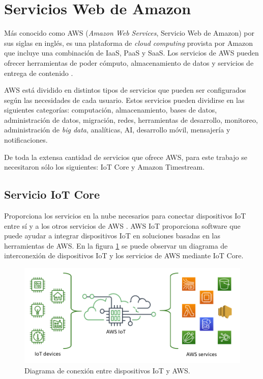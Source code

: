 \section{Servicios Web de Amazon}
Más conocido como AWS (\textit{Amazon Web Services}, Servicio Web de Amazon) por sus siglas en inglés, es una plataforma de \textit{cloud computing} provista por Amazon que incluye una combinación de IaaS, PaaS y SaaS. Los servicios de AWS pueden ofrecer herramientas de poder cómputo, almacenamiento de datos y servicios de entrega de contenido \cite{aws_info}.

AWS está dividido en distintos tipos de servicios que pueden ser configurados según las necesidades de cada usuario. Estos servicios pueden dividirse en las siguientes categorías: computación, almacenamiento, bases de datos, administración de datos, migración, redes, herramientas de desarrollo, monitoreo, administración de \textit{big data}, analíticas, AI, desarrollo móvil, mensajería y notificaciones.

De toda la extensa cantidad de servicios que ofrece AWS, para este trabajo se necesitaron sólo los siguientes: IoT Core y Amazon Timestream.

\subsection{Servicio IoT Core}
Proporciona los servicios en la nube necesarios para conectar dispositivos IoT entre sí y a los otros servicios de AWS \cite{iot_info}. AWS IoT proporciona software que puede ayudar a integrar dispositivos IoT en soluciones basadas en las herramientas de AWS. En la figura \ref{fig:aws_iot} se puede observar un diagrama de interconexión de dispositivos IoT y los servicios de AWS mediante IoT Core.


\begin{figure}[h]
	\centering
	\includegraphics[scale=0.5]{./Figures/aws_iot.png}
	\caption{Diagrama de conexión entre dispositivos IoT y AWS\protect\footnotemark.}
	\label{fig:aws_iot}
\end{figure}

